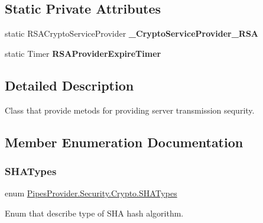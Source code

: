 \subsection*{Static Private Attributes}
\begin{DoxyCompactItemize}
\item 
\mbox{\label{class_pipes_provider_1_1_security_1_1_crypto_a085f49881af05eb6029d21fa8aab4439}} 
static R\+S\+A\+Crypto\+Service\+Provider {\bfseries \+\_\+\+Crypto\+Service\+Provider\+\_\+\+R\+SA}
\item 
\mbox{\label{class_pipes_provider_1_1_security_1_1_crypto_a3f5346401a457cde84339dcaf7f4ba21}} 
static Timer {\bfseries R\+S\+A\+Provider\+Expire\+Timer}
\end{DoxyCompactItemize}


\subsection{Detailed Description}
Class that provide metods for providing server transmission sequrity. 



\subsection{Member Enumeration Documentation}
\mbox{\label{class_pipes_provider_1_1_security_1_1_crypto_a6956e9aac98864917946b750dee3596e}} 
\subsubsection{\texorpdfstring{S\+H\+A\+Types}{SHATypes}}
{\footnotesize\ttfamily enum \mbox{\hyperlink{class_pipes_provider_1_1_security_1_1_crypto_a6956e9aac98864917946b750dee3596e}{Pipes\+Provider.\+Security.\+Crypto.\+S\+H\+A\+Types}}\hspace{0.3cm}{\ttfamily [strong]}}



Enum that describe type of S\+HA hash algorithm. 



